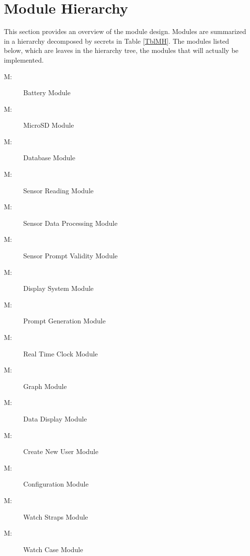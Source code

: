 \documentclass[12pt, titlepage]{article}
\newcounter{mnum}
\newcommand{\mthemnum}{M\themnum}
\begin{document}
\section{Module Hierarchy} \label{SecMH}

This section provides an overview of the module design. Modules are summarized
in a hierarchy decomposed by secrets in Table \ref{TblMH}. The modules listed
below, which are leaves in the hierarchy tree, the modules that will
actually be implemented.

\begin{description}
  \item [ \mthemnum \label{mBM}:] Battery Module
  \item [ \mthemnum \label{mDS_1}:] MicroSD Module
  \item [ \mthemnum \label{mDS_2}:] Database Module
  \item [ \mthemnum \label{mSA1}:] Sensor Reading Module
  \item [ \mthemnum \label{mSA2}:] Sensor Data Processing Module
  \item [ \mthemnum \label{mSA3}:] Sensor Prompt Validity Module
  \item [ \mthemnum \label{mDS_2}:] Display System Module
  \item [ \mthemnum \label{mPG}:] Prompt Generation Module
  \item [ \mthemnum \label{mRTC}:] Real Time Clock  Module
  \item [ \mthemnum \label{mGP}:] Graph  Module
  \item [ \mthemnum \label{mGP2}:] Data Display Module
  \item [ \mthemnum \label{mPS}:] Create New User Module
  \item [ \mthemnum \label{mPS2}:] Configuration Module
  \item [ \mthemnum \label{mPD}:]  Watch Straps Module
  \item [ \mthemnum \label{mPD2}:] Watch Case Module
\end{description}
\end{document}
